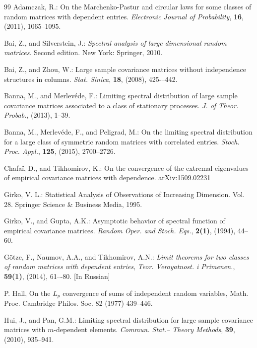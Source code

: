 \documentclass[12pt, a4paper]{article}
\begin{document}
\begin{thebibliography}{99}
 Adamczak, R.: On the Marchenko-Pastur and circular laws for some classes of random matrices with dependent entries. {\it Electronic Journal of Probability},  {\bf 16}, (2011), 1065--1095.

 Bai, Z., and Silverstein, J.: {\it Spectral analysis of large dimensional random matrices}. Second edition. New York: Springer, 2010.

 Bai, Z., and Zhou, W.: Large sample covariance matrices without independence structures in columns. {\it
Stat. Sinica}, {\bf 18}, (2008), 425-–442.

 Banna, M., and Merlev\'ede, F.: Limiting spectral distribution of large sample covariance
matrices associated to a class of stationary processes. {\it J. of Theor. Probab.}, (2013), 1--39.

 Banna, M., Merlev\'ede, F., and Peligrad, M.: On the limiting spectral distribution for a large class of symmetric random matrices with correlated entries. {\it Stoch. Proc. Appl.}, {\bf 125}, (2015), 2700--2726.

 Chafa\"i, D., and Tikhomirov, K.: On the convergence of the extremal eigenvalues of empirical covariance matrices with dependence. arXiv:1509.02231


  Girko, V. L.: Statistical Analysis of Observations of Increasing Dimension. Vol. 28. Springer Science \& Business Media, 1995.

 Girko, V., and Gupta, A.K.:  Asymptotic behavior of spectral function of empirical
covariance matrices. {\it Random Oper. and Stoch. Eqs.}, {\bf 2(1)}, (1994), 44--60.


 G\"otze, F.,   Naumov, A.A., and Tikhomirov, A.N.: {\it Limit theorems for two classes of random matrices with dependent entries}, {\it Teor. Veroyatnost. i Primenen.}, {\bf 59(1)}, (2014), 61–-80. [In Russian] 



 P. Hall,  On the $L_p$ convergence of sums of independent random variables, Math. Proc. Cambridge Philos. Soc.  82 (1977) 439--446.


 Hui, J., and Pan, G.M.: Limiting spectral distribution for large sample covariance matrices with $m$-dependent elements. {\it Commun. Stat.-- Theory Methods}, {\bf 39}, (2010), 935--941.



\end{thebibliography}
\end{document}
